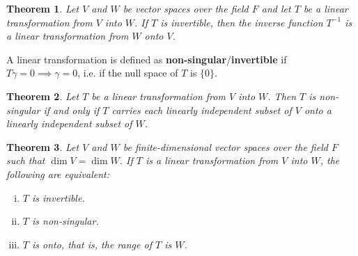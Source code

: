 \documentclass{article}
\newtheorem{theorem}{Theorem}[section]
\begin{document}
\begin{theorem}
  Let $V$ and $W$ be vector spaces over the field $F$ and let $T$ be a linear
  transformation from $V$ into $W$. If $T$ is invertible, then the inverse
  function $T^{-1}$ is a linear transformation from $W$ onto $V$.
\end{theorem}

A linear transformation is defined as \textbf{non-singular}/\textbf{invertible}
if $T\gamma = 0 \implies \gamma = 0$, i.e. if the null space of $T$ is $\{0\}$.

\begin{theorem}
  Let $T$ be a linear transformation from $V$ into $W$. Then $T$ is non-singular
  if and only if $T$ carries each linearly independent subset of $V$ onto a
  linearly independent subset of $W$.
\end{theorem}

\begin{theorem}
  Let $V$ and $W$ be finite-dimensional vector spaces over the field $F$ such
  that $\dim V = \dim W$. If $T$ is a linear transformation from $V$ into $W$,
  the following are equivalent:
  \begin{enumerate}[(i)]
    \item $T$ is invertible.
    \item $T$ is non-singular.
    \item $T$ is onto, that is, the range of $T$ is $W$.
  \end{enumerate}
\end{theorem}
\end{document}
